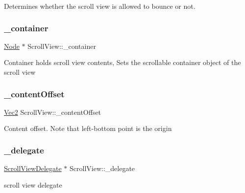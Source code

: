 Determines whether the scroll view is allowed to bounce or not. \mbox{\label{classScrollView_a81d46625d9c9566a8ffb58c2b7a16f19}} 
\subsubsection{\texorpdfstring{\+\_\+container}{\_container}}
{\footnotesize\ttfamily \hyperlink{classNode}{Node} $\ast$ Scroll\+View\+::\+\_\+container\hspace{0.3cm}{\ttfamily [protected]}}

Container holds scroll view contents, Sets the scrollable container object of the scroll view \mbox{\label{classScrollView_a33f263e50cdf70ec078e863b49ecbaf9}} 
\subsubsection{\texorpdfstring{\+\_\+content\+Offset}{\_contentOffset}}
{\footnotesize\ttfamily \hyperlink{classVec2}{Vec2} Scroll\+View\+::\+\_\+content\+Offset\hspace{0.3cm}{\ttfamily [protected]}}

Content offset. Note that left-\/bottom point is the origin \mbox{\label{classScrollView_a34ebfd00cb6aa44524e6330104de951c}} 
\subsubsection{\texorpdfstring{\+\_\+delegate}{\_delegate}}
{\footnotesize\ttfamily \hyperlink{classScrollViewDelegate}{Scroll\+View\+Delegate} $\ast$ Scroll\+View\+::\+\_\+delegate\hspace{0.3cm}{\ttfamily [protected]}}

scroll view delegate \mbox{\label{classScrollView_a273f65143fd85a5059b6542f03394817}} 
